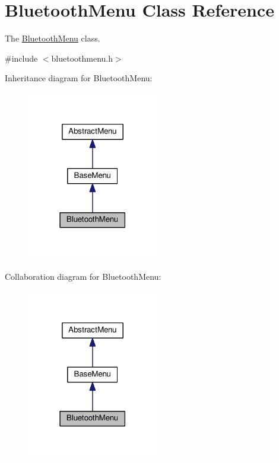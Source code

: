\hypertarget{classBluetoothMenu}{}\section{Bluetooth\+Menu Class Reference}
\label{classBluetoothMenu}


The \hyperlink{classBluetoothMenu}{Bluetooth\+Menu} class.  




{\ttfamily \#include $<$bluetoothmenu.\+h$>$}



Inheritance diagram for Bluetooth\+Menu\+:\nopagebreak
\begin{figure}[H]
\begin{center}
\leavevmode
\includegraphics[width=162pt]{classBluetoothMenu__inherit__graph}
\end{center}
\end{figure}


Collaboration diagram for Bluetooth\+Menu\+:\nopagebreak
\begin{figure}[H]
\begin{center}
\leavevmode
\includegraphics[width=162pt]{classBluetoothMenu__coll__graph}
\end{center}
\end{figure}
